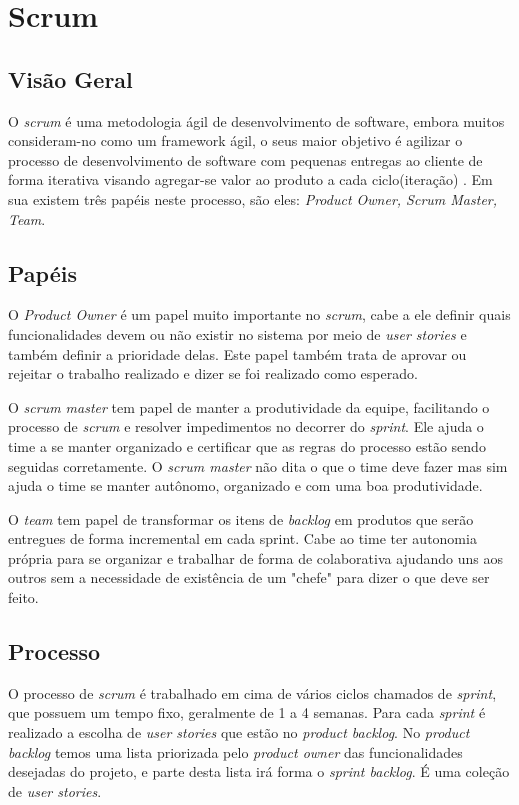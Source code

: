 \documentclass{abnt}
\begin{document}
	\section{Scrum}
	
		\subsection{Visão Geral}
		
			O \emph{scrum} é uma metodologia ágil de desenvolvimento de software, embora muitos consideram-no como um framework ágil, 
			o seus maior objetivo é agilizar o processo de desenvolvimento de software com pequenas entregas ao cliente de forma iterativa
			visando agregar-se valor ao produto a cada ciclo(iteração) . Em sua existem três papéis neste processo, são eles: \emph{Product Owner, Scrum Master, Team}.
		
		\subsection{Papéis}
		
			O \emph{Product Owner} é um papel muito importante no \emph{scrum}, cabe a ele definir quais funcionalidades devem ou
			não existir no sistema por meio de \emph{user stories} e também definir a prioridade delas. Este pa\texttt{}pel também
			trata de aprovar ou rejeitar o trabalho realizado e dizer se foi realizado como esperado.
			
			O \emph{scrum master} tem papel de manter a produtividade da equipe, facilitando o processo de \emph{scrum} e resolver impedimentos
			no decorrer do \emph{sprint}. Ele ajuda o time a se manter organizado e certificar que as regras do processo estão sendo
			seguidas corretamente. O \emph{scrum master} não dita o que o time deve fazer mas sim ajuda o time se manter autônomo,
			organizado e com uma boa produtividade. 
			
			O \emph{team} tem papel de transformar os itens de \emph{backlog} em produtos que serão entregues de forma incremental em cada
			sprint. Cabe ao time ter autonomia própria para se organizar e trabalhar de forma de colaborativa ajudando uns aos
			outros sem a necessidade de existência de um "chefe" para dizer o que deve ser feito.
		
		\subsection{Processo}
		
			O processo de \emph{scrum} é trabalhado em cima de vários ciclos chamados de \emph{sprint}, que possuem um tempo fixo, geralmente de
			1 a 4 semanas. Para cada \emph{sprint} é realizado a escolha de \emph{user stories} que estão no \emph{product backlog}. No \emph{product backlog} temos uma lista priorizada 
			pelo \emph{product owner} das funcionalidades desejadas do projeto, e parte desta lista irá forma o \emph{sprint backlog}. É uma coleção de \emph{user stories}.
			
\end{document}

